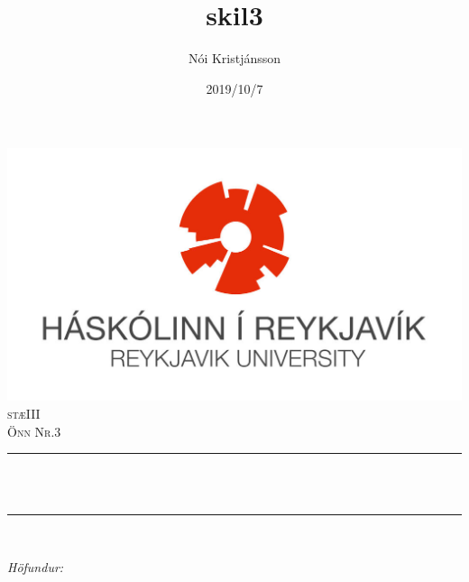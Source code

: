 \documentclass[12pt]{article}
\title{skil3}
\author{Nói Kristjánsson}
\date{2019/10/7}
\makeatletter
\let\thetitle\@title
\let\theauthor\@author
\let\thedate\@date
\makeatother
\begin{document}

\begin{titlepage}
    \centering
    \vspace*{0.5 cm}
    \includegraphics[scale = 1.15]{HR_logo_midjad_hires.jpg}\\[1.0 cm]	%
    \textsc{\Large stæIII}\\[0.5 cm]				%
    \textsc{\large Önn Nr.3}\\[0.5 cm]				%
    \rule{\linewidth}{0.2 mm} \\[0.4 cm]
    { \huge \bfseries \thetitle}\\
    \rule{\linewidth}{0.2 mm} \\[1.5 cm]
    
    \begin{minipage}{0.4\textwidth}
        \begin{flushleft} \large
            \emph{Höfundur:}\\
            \theauthor
            \end{flushleft}
            \end{minipage}~
            \begin{minipage}{0.4\textwidth}
            \begin{flushright} \large
        \end{flushright}
    \end{minipage}\\[2 cm]
    
    {\large \thedate}\\[2 cm]

    \vfill
    
\end{titlepage}


\end{document}
